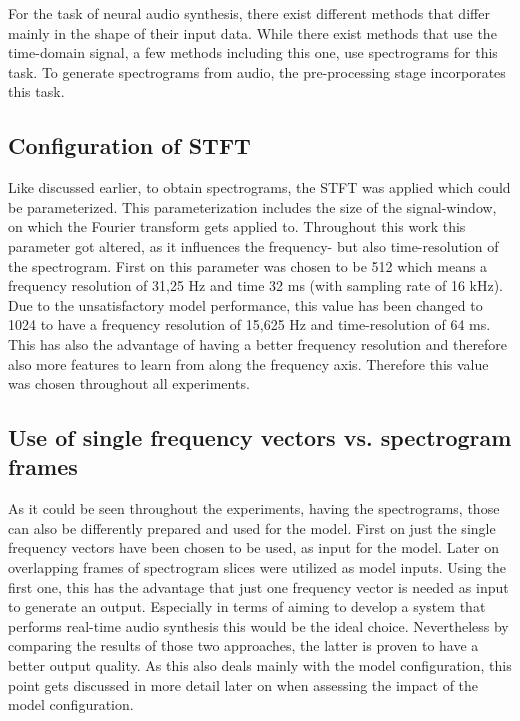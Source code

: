 For the task of neural audio synthesis, there exist different methods that differ mainly in the shape of their input data. While there exist methods that use the time-domain signal, a few methods including this one, use spectrograms for this task. To generate spectrograms from audio, the pre-processing stage incorporates this task. 

\subsection{Configuration of STFT}
Like discussed earlier, to obtain spectrograms, the STFT was applied which could be parameterized. This parameterization includes the size of the signal-window, on which the Fourier transform gets applied to. Throughout this work this parameter got altered, as it influences the frequency- but also time-resolution of the spectrogram. First on this parameter was chosen to be 512 which means a frequency resolution of 31,25 Hz and time 32 ms (with sampling rate of 16 kHz). Due to the unsatisfactory model performance, this value has been changed to 1024 to have a frequency resolution of 15,625 Hz and time-resolution of 64 ms. This has also the advantage of having a better frequency resolution and therefore also more features to learn from along the frequency axis. Therefore this value was chosen throughout all experiments.

\subsection{Use of single frequency vectors vs. spectrogram frames}
As it could be seen throughout the experiments, having the spectrograms, those can also be differently prepared and used for the model. First on just the single frequency vectors have been chosen to be used, as input for the model. Later on overlapping frames of spectrogram slices were utilized as model inputs. Using the first one, this has the advantage that just one frequency vector is needed as input to generate an output. Especially in terms of aiming to develop a system that performs real-time audio synthesis this would be the ideal choice. Nevertheless by comparing the results of those two approaches, the latter is proven to have a better output quality. As this also deals mainly with the model configuration, this point gets discussed in more detail later on when assessing the impact of the model configuration. 

